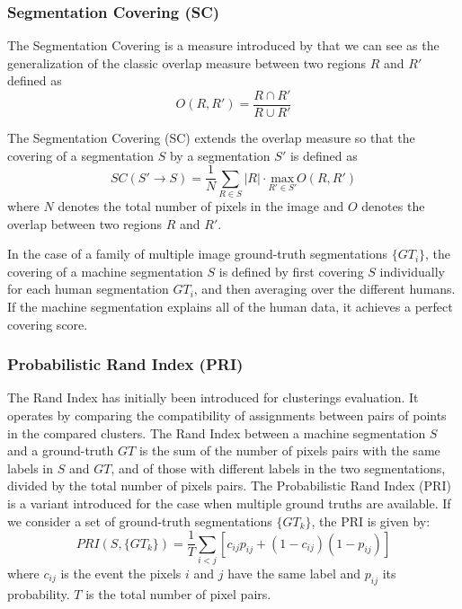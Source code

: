 \subsubsection{Segmentation Covering (SC)}

The Segmentation Covering is a measure introduced by \cite{Arbelaez.Maire.ea:PR:2009} that we can see as the generalization of the classic overlap measure between two regions $R$ and $R'$ defined as
\begin{equation}
	O(R, R') = \frac{R \cap R'}{R \cup R'}
\end{equation}

The Segmentation Covering (SC) extends the overlap measure so that the covering of a segmentation $S$ by a segmentation $S'$ is defined as 
\begin{equation}
	SC(S' \rightarrow S) = \frac{1}{N}\sum_{R \in S} |R| \cdot \underset{R' \in S'}{\mathrm{max}} O(R, R')
\end{equation}
where $N$ denotes the total number of pixels in the image and $O$ denotes the overlap between two regions $R$ and $R'$.

In the case of a family of multiple image ground-truth segmentations $\{GT_i\}$, the covering of a machine segmentation $S$ is defined by first covering $S$ individually for each human segmentation $GT_i$, and then averaging over the different humans. If the machine segmentation explains all of the human data, it achieves a perfect covering score.

\subsubsection{Probabilistic Rand Index (PRI)}
The Rand Index has initially been introduced for clusterings evaluation. It operates by comparing the compatibility of assignments between pairs of points in the compared clusters. The Rand Index between a machine segmentation $S$ and a ground-truth $GT$ is the sum of the number of pixels pairs with the same labels in $S$ and $GT$, and of those with different labels in the two segmentations, divided by the total number of pixels pairs. The Probabilistic Rand Index (PRI) \citep{Unnikrishnan.Pantofaru.ea:CVPR:2005} is a variant introduced for the case when multiple ground truths are available. If we consider a set of ground-truth segmentations $\{GT_k\}$, the PRI is given by:
\begin{equation}
	PRI(S, \{GT_k\}) = \frac{1}{T}\sum_{i<j} [c_{ij}p_{ij} + (1-c_{ij})(1-p_{ij})]
\end{equation}
where $c_{ij}$ is the event the pixels $i$ and $j$ have the same label and $p_{ij}$ its probability. $T$ is the total number of pixel pairs.

